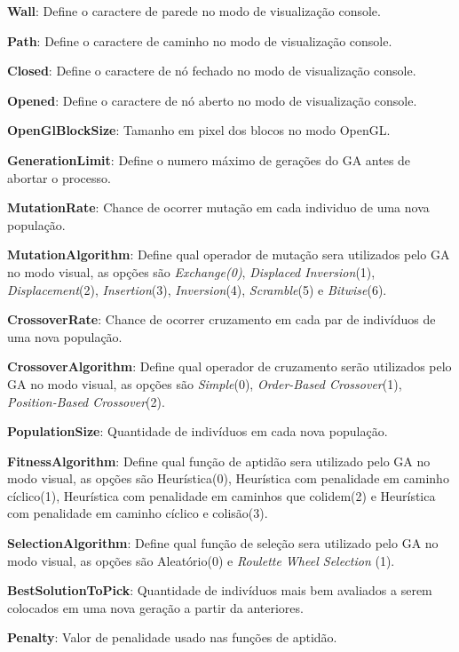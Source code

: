  \textbf{Wall}: Define o caractere de parede no modo de visualização console.
 
 \textbf{Path}: Define o caractere de caminho no modo de visualização console.
 
 \textbf{Closed}: Define o caractere de nó fechado no modo de visualização console.
 
 \textbf{Opened}: Define o caractere de nó aberto no modo de visualização console.
 
 \textbf{OpenGlBlockSize}: Tamanho em pixel dos blocos no modo OpenGL.
 
 
 \textbf{GenerationLimit}: Define o numero máximo de gerações do GA antes de abortar o processo.
 
 \textbf{MutationRate}: Chance de ocorrer mutação em cada individuo de uma nova população.
 
 \textbf{MutationAlgorithm}:  Define qual operador de mutação sera utilizados pelo GA no modo visual, as opções são  \textit{Exchange(0)}, \textit{Displaced Inversion}(1), \textit{Displacement}(2), \textit{Insertion}(3), \textit{Inversion}(4), \textit{Scramble}(5) e \textit{Bitwise}(6).
 
 \textbf{CrossoverRate}: Chance de ocorrer cruzamento em cada par de indivíduos de uma nova população.
 
 \textbf{CrossoverAlgorithm}: Define qual operador de cruzamento serão utilizados pelo GA no modo visual, as opções são  \textit{Simple}(0), \textit{Order-Based Crossover}(1), \textit{Position-Based Crossover}(2).
 
 \textbf{PopulationSize}: Quantidade de indivíduos em cada nova população.
 
 \textbf{FitnessAlgorithm}: Define qual função de aptidão sera utilizado pelo GA no modo visual, as opções são Heurística(0), Heurística com penalidade em caminho cíclico(1), Heurística com penalidade em caminhos que colidem(2) e Heurística com penalidade em caminho cíclico e colisão(3).
 
 \textbf{SelectionAlgorithm}: Define qual função de seleção sera utilizado pelo GA no modo visual, as opções são  Aleatório(0) e \textit{Roulette Wheel Selection} (1).
 
 \textbf{BestSolutionToPick}: Quantidade de indivíduos mais bem avaliados a serem colocados em uma nova geração a partir da anteriores.
 
 \textbf{Penalty}: Valor de penalidade usado nas funções de aptidão.
 